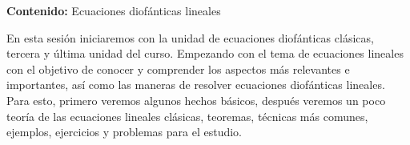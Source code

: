 {\Large\textbf{Contenido:} Ecuaciones diofánticas lineales}

En esta sesión iniciaremos con la unidad de ecuaciones diofánticas clásicas, tercera y última unidad del curso.
Empezando con el tema de ecuaciones lineales con el objetivo de conocer y comprender los aspectos más relevantes e importantes,
así como las maneras de resolver ecuaciones diofánticas lineales.
Para esto, primero veremos algunos hechos básicos, después veremos un poco teoría de las ecuaciones lineales clásicas,
teoremas, técnicas más comunes, ejemplos, ejercicios y problemas para el estudio.